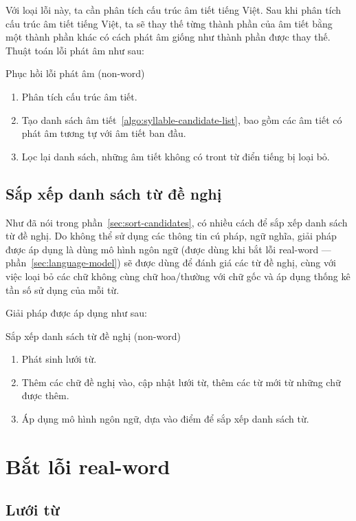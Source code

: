 \documentclass[a4paper,oneside,14pt]{extbook} %
\begin{document}
Với loại lỗi này, ta cần phân tích cấu trúc âm tiết tiếng Việt. Sau
khi phân tích cấu trúc âm tiết tiếng Việt, ta sẽ thay thế từng thành
phần của âm tiết bằng một thành phần khác có cách phát âm giống như
thành phần được thay thế. Thuật toán lỗi phát âm như sau:
\begin{algo}\caption{Phục hồi lỗi phát âm (non-word)}
  \begin{enumerate}
  \item Phân tích cấu trúc âm tiết.
  \item Tạo danh sách âm tiết~\ref{algo:syllable-candidate-list}, bao
    gồm các âm tiết có phát âm tương tự với âm tiết ban đầu.
  \item Lọc lại danh sách, những âm tiết không có tront từ điển tiếng
    bị loại bỏ.
  \end{enumerate}
\end{algo}

\subsection{Sắp xếp danh sách từ đề nghị}
\label{sec:nonword:sort-candidates}

Như đã nói trong phần~\ref{sec:sort-candidates}, có nhiều cách để sắp
xếp danh sách từ đề nghị. Do không thể sử dụng các thông tin cú pháp,
ngữ nghĩa, giải pháp được áp dụng là dùng mô hình ngôn ngữ (được dùng
khi bắt lỗi real-word --- phần~\ref{sec:language-model}) sẽ được dùng
để đánh giá các từ đề nghị, cùng với việc loại bỏ các chữ không cùng
chữ hoa/thường với chữ gốc và áp dụng thống kê tần số sử dụng của mỗi
từ.

Giải pháp được áp dụng như sau:
\begin{algo}\caption{Sắp xếp danh sách từ đề nghị (non-word)}
  \begin{enumerate}
  \item Phát sinh lưới từ.
  \item Thêm các chữ đề nghị vào, cập nhật lưới từ, thêm các từ mới từ
    những chữ được thêm. 
  \item Áp dụng mô hình ngôn ngữ, dựa vào điểm để sắp xếp danh sách từ.
  \end{enumerate}
\end{algo}

\section{Bắt lỗi real-word}

\subsection{Lưới từ}
\label{sec:wordlattice}
\end{document}
